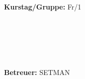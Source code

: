 \documentclass{article}
\begin{document}
\begin{verbatim}


\end{verbatim}
			\begin{flushleft}
			\textbf{\Large{Kurstag/Gruppe:}} \Large{Fr/1}
			\end{flushleft}

\begin{verbatim}






\end{verbatim}
			\begin{flushleft}
			\LARGE{\textbf{Betreuer:}}	\Large{SETMAN}	
			\end{flushleft}
\newpage
\end{document}
